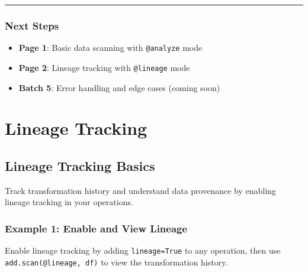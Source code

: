 \documentclass[
  letterpaper,
]{scrbook}
\providecommand{\tightlist}{%
  \setlength{\itemsep}{0pt}\setlength{\parskip}{0pt}}
\begin{document}
\begin{center}\rule{0.5\linewidth}{0.5pt}\end{center}

\section{Next Steps}\label{next-steps-18}

\begin{itemize}
\tightlist
\item
  \textbf{Page 1}: Basic data scanning with \texttt{@analyze} mode
\item
  \textbf{Page 2}: Lineage tracking with \texttt{@lineage} mode
\item
  \textbf{Batch 5}: Error handling and edge cases (coming soon)
\end{itemize}

\part{Lineage Tracking}

\chapter{Lineage Tracking Basics}\label{lineage-tracking-basics}

Track transformation history and understand data provenance by enabling
lineage tracking in your operations.

\section{Example 1: Enable and View
Lineage}\label{example-1-enable-and-view-lineage}

Enable lineage tracking by adding \texttt{lineage=True} to any
operation, then use
\texttt{add.scan(\textquotesingle{}@lineage\textquotesingle{},\ df)} to
view the transformation history.
\end{document}
